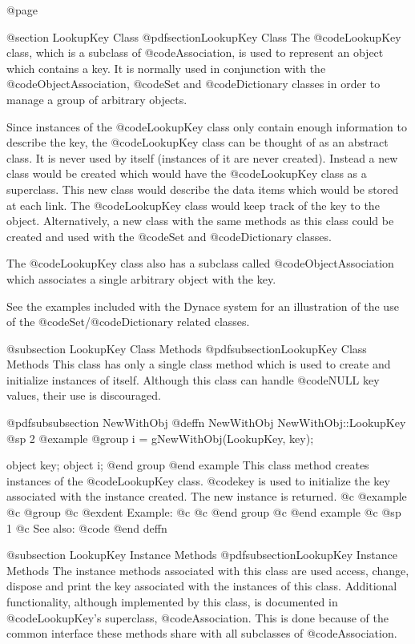 @page

@section LookupKey Class
@pdfsection{LookupKey Class}
The @code{LookupKey} class, which is a subclass of @code{Association},
is used to represent an object which contains a key.  It is normally
used in conjunction with the @code{ObjectAssociation}, @code{Set} and
@code{Dictionary} classes in order to manage a group of arbitrary
objects.

Since instances of the @code{LookupKey} class only contain enough
information to describe the key, the @code{LookupKey} class can be
thought of as an abstract class.  It is never used by itself (instances
of it are never created).  Instead a new class would be created which
would have the @code{LookupKey} class as a superclass.  This new class
would describe the data items which would be stored at each link.  The
@code{LookupKey} class would keep track of the key to the object.
Alternatively, a new class with the same methods as this class could be
created and used with the @code{Set} and @code{Dictionary} classes.

The @code{LookupKey} class also has a subclass called
@code{ObjectAssociation} which associates a single arbitrary object with
the key.

See the examples included with the Dynace system for an illustration of the
use of the @code{Set}/@code{Dictionary} related classes.



@subsection LookupKey Class Methods
@pdfsubsection{LookupKey Class Methods}
This class has only a single class method which is used to create and
initialize instances of itself.   Although this class can handle
@code{NULL} key values, their use is discouraged.






@pdfsubsubsection {NewWithObj}
@deffn {NewWithObj} NewWithObj::LookupKey
@sp 2
@example
@group
i = gNewWithObj(LookupKey, key);

object  key;
object  i;
@end group
@end example
This class method creates instances of the @code{LookupKey} class.
@code{key} is used to initialize the key associated with the instance
created.  The new instance is returned.
@c @example
@c @group
@c @exdent Example:
@c 
@c @end group
@c @end example
@c @sp 1
@c See also:  @code{}
@end deffn




@subsection LookupKey Instance Methods
@pdfsubsection{LookupKey Instance Methods}
The instance methods associated with this class are used access, change,
dispose and print the key associated with the instances of this class.
Additional functionality, although implemented by this class, is documented
in @code{LookupKey}'s superclass, @code{Association}.  This is done
because of the common interface these methods share with all subclasses
of @code{Association}.







